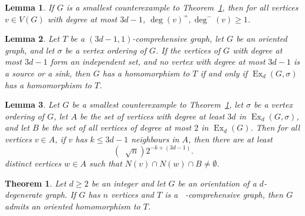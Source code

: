 \documentclass[10pt,a4paper]{amsart}
\newtheorem{theorem}{Theorem}
\newtheorem{lemma}{Lemma}
\DeclareMathOperator{\bound}{\Big( 3d-1, \coe\sqrt{n}\Big)}
\DeclareMathOperator{\coe}{6\Big(1+\frac{9d^2}{4}\Big)^{\frac{1}{2}}d}
\DeclareMathOperator{\ex}{\text{Ex}}
\begin{document}
\begin{lemma}\label{Lemma: counter-no-oneway}
    If $G$ is a smallest counterexample to Theorem~\ref{Thm: Critical Upper},
    then for all vertices $v \in V(G)$ with degree at most $3d-1$,
    $\deg(v)^+,\deg^-(v)\geq 1$.
\end{lemma}

\begin{lemma}\label{Lemma: extendedEquiv}
    Let $T$ be a $(3d-1,1)$-comprehensive graph,
    let $G$ be an oriented graph, and let $\sigma$ be a vertex ordering of $G$.
    If the vertices of $G$ with degree at most $3d-1$ form an independent set,
    and no vertex with degree at most $3d-1$ is a source or a sink,
    then $G$ has a homomorphism to $T$ if and only if 
    $\ex_d(G,\sigma)$ has a homomorphism to $T$.
\end{lemma}

\begin{lemma}\label{Lemma: The Fun Bit}
    Let $G$ be a smallest counterexample to Theorem~\ref{Thm: Critical Upper}, let $\sigma$ be a vertex ordering of $G$,
    let $A$ be the set of vertices with degree at least $3d$ in $\ex_d(G,\sigma)$, and let $B$ be the set of all vertices of degree at most $2$ in $\ex_d(G)$.
    Then 
    for all vertices $v \in A$, if $v$ has $k\leq 3d-1$ neighbours in $A$, 
    then 
    there are at least
    \[
    (\coe\sqrt{n})2^{-k+(3d-1)}.
    \]
    distinct vertices $w\in A$ such that $N(v)\cap N(w)\cap B \neq \emptyset$.
\end{lemma}

\begin{theorem}\label{Thm: Critical Upper}
    Let $d\geq 2$ be an integer and let $G$ be an orientation of a $d$-degenerate graph.
    If $G$ has $n$ vertices
    and $T$ is a $\bound$-comprehensive graph, then $G$ admits an oriented homomorphism to $T$.
\end{theorem}
\end{document}
